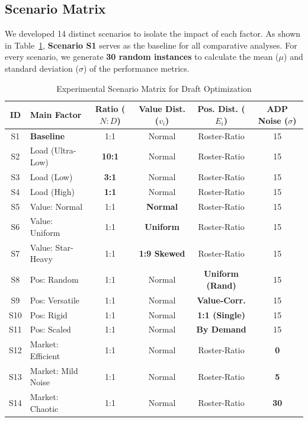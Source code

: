 \documentclass[11pt,a4paper]{article}
\begin{document}
\subsection{Scenario Matrix}

We developed 14 distinct scenarios to isolate the impact of each factor. As shown in Table~\ref{tab:scenario_matrix}, \textbf{Scenario S1} serves as the baseline for all comparative analyses. For every scenario, we generate \textbf{30 random instances} to calculate the mean ($\mu$) and standard deviation ($\sigma$) of the performance metrics.

\begin{table}[htbp]
\centering
\caption{Experimental Scenario Matrix for Draft Optimization}
\label{tab:scenario_matrix}
\small
\begin{tabular}{clcccc}
\toprule
\textbf{ID} & \textbf{Main Factor} & \textbf{Ratio ($N:D$)} & \textbf{Value Dist. ($v_i$)} & \textbf{Pos. Dist. ($E_i$)} & \textbf{ADP Noise ($\sigma$)} \\ \midrule
S1 & \textbf{Baseline} & 1:1 & Normal & Roster-Ratio & 15 \\ 
S2 & Load (Ultra-Low) & \textbf{10:1} & Normal & Roster-Ratio & 15 \\
S3 & Load (Low) & \textbf{3:1} & Normal & Roster-Ratio & 15 \\
S4 & Load (High) & \textbf{1:1} & Normal & Roster-Ratio & 15 \\ \midrule
S5 & Value: Normal & 1:1 & \textbf{Normal} & Roster-Ratio & 15 \\
S6 & Value: Uniform & 1:1 & \textbf{Uniform} & Roster-Ratio & 15 \\
S7 & Value: Star-Heavy & 1:1 & \textbf{1:9 Skewed} & Roster-Ratio & 15 \\ \midrule
S8 & Pos: Random & 1:1 & Normal & \textbf{Uniform (Rand)} & 15 \\
S9 & Pos: Versatile & 1:1 & Normal & \textbf{Value-Corr.} & 15 \\
S10 & Pos: Rigid & 1:1 & Normal & \textbf{1:1 (Single)} & 15 \\
S11 & Pos: Scaled & 1:1 & Normal & \textbf{By Demand} & 15 \\ \midrule
S12 & Market: Efficient & 1:1 & Normal & Roster-Ratio & \textbf{0} \\
S13 & Market: Mild Noise & 1:1 & Normal & Roster-Ratio & \textbf{5} \\
S14 & Market: Chaotic & 1:1 & Normal & Roster-Ratio & \textbf{30} \\ \bottomrule
\end{tabular}
\end{table}
\end{document}
